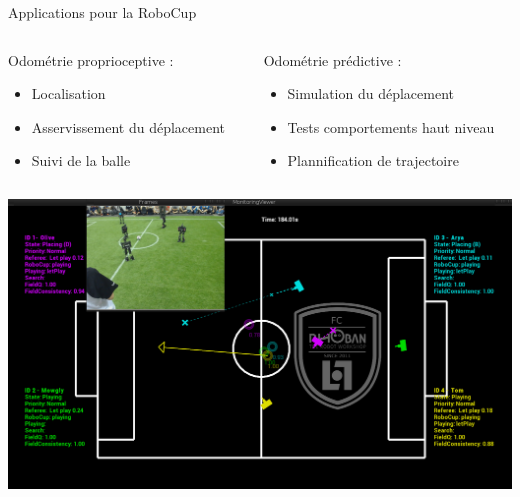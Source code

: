 \begin{frame}{Applications pour la RoboCup}
    \begin{columns}
        \begin{column}{0.49\linewidth}
            Odométrie proprioceptive :
            \begin{itemize}
                \item Localisation
                \item Asservissement du déplacement
                \item Suivi de la balle
            \end{itemize}
        \end{column}
        \begin{column}{0.49\linewidth}
            Odométrie prédictive :
            \begin{itemize}
                \item Simulation du déplacement
                \item Tests comportements haut niveau
                \item Plannification de trajectoire
            \end{itemize}
        \end{column}
    \end{columns}
    \vspace{0.2cm}
    \centering
    \includegraphics[width=0.85\linewidth]{../media/monitoring.png}
\end{frame}

